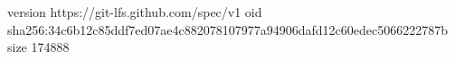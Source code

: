 version https://git-lfs.github.com/spec/v1
oid sha256:34c6b12c85ddf7ed07ae4c882078107977a94906dafd12c60edec5066222787b
size 174888
